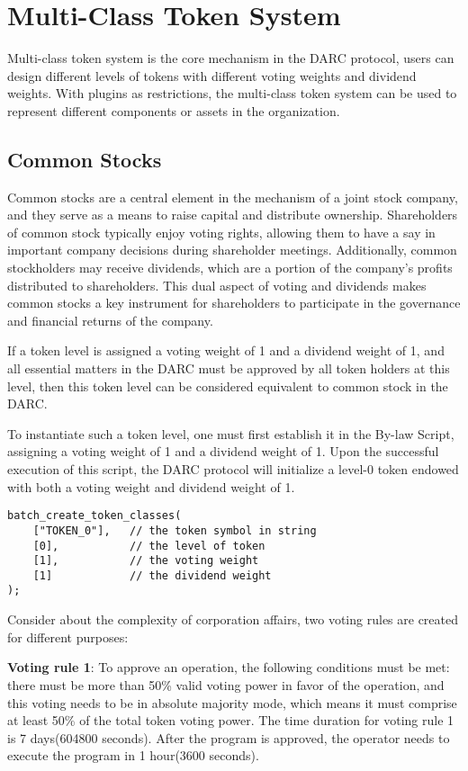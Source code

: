 \documentclass[main.tex]{subfiles}
\begin{document}
\section{Multi-Class Token System}

Multi-class token system is the core mechanism in the DARC protocol, users can design different levels of tokens with different voting weights and dividend weights. With plugins as restrictions, the multi-class token system can be used to represent different components or assets in the organization. 

\subsection{Common Stocks}


Common stocks are a central element in the mechanism of a joint stock company, and they serve as a means to raise capital and distribute ownership. Shareholders of common stock typically enjoy voting rights, allowing them to have a say in important company decisions during shareholder meetings. Additionally, common stockholders may receive dividends, which are a portion of the company's profits distributed to shareholders. This dual aspect of voting and dividends makes common stocks a key instrument for shareholders to participate in the governance and financial returns of the company.

If a token level is assigned a voting weight of 1 and a dividend weight of 1, and all essential matters in the DARC must be approved by all token holders at this level, then this token level can be considered equivalent to common stock in the DARC.

To instantiate such a token level, one must first establish it in the By-law Script, assigning a voting weight of 1 and a dividend weight of 1. Upon the successful execution of this script, the DARC protocol will initialize a level-0 token endowed with both a voting weight and dividend weight of 1.

\begin{verbatim}
batch_create_token_classes(
    ["TOKEN_0"],   // the token symbol in string
    [0],           // the level of token
    [1],           // the voting weight
    [1]            // the dividend weight
);
\end{verbatim}

Consider about the complexity of corporation affairs, two voting rules are created for different purposes:

\textbf{Voting rule 1}: To approve an operation, the following conditions must be met: there must be more than 50\% valid voting power in favor of the operation, and this voting needs to be in absolute majority mode, which means it must comprise at least 50\% of the total token voting power. The time duration for voting rule 1 is 7 days(604800 seconds). After the program is approved, the operator needs to execute the program in 1 hour(3600 seconds).
\end{document}
